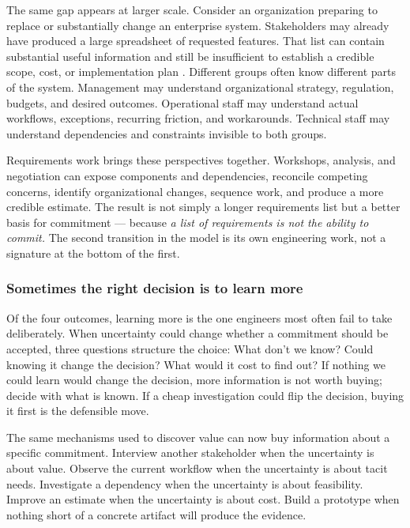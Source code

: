The same gap appears at larger scale. Consider an organization preparing to replace or substantially
change an enterprise system. Stakeholders may already have produced a large spreadsheet of requested
features. That list can contain substantial useful information and still be insufficient to
establish a credible scope, cost, or implementation plan \citep{kostova2019canvas}. Different groups often know
different parts of the system. Management may understand organizational strategy, regulation,
budgets, and desired outcomes. Operational staff may understand actual workflows, exceptions,
recurring friction, and workarounds. Technical staff may understand dependencies and constraints
invisible to both groups.

Requirements work brings these perspectives together. Workshops, analysis, and negotiation can
expose components and dependencies, reconcile competing concerns, identify organizational changes,
sequence work, and produce a more credible estimate. The result is not simply a longer requirements
list but a better basis for commitment --- because \emph{a list of requirements is not the ability to
commit.} The second transition in the model is its own engineering work, not a signature at the
bottom of the first.

\subsubsection{Sometimes the right decision is to learn more}\label{sec-learn-more}

Of the four outcomes, learning more is the one engineers most often fail to take deliberately. When
uncertainty could change whether a commitment should be accepted, three questions structure the
choice: What don't we know? Could knowing it change the decision? What would it cost to find out?
If nothing we could learn would change the decision, more information is not worth buying; decide
with what is known. If a cheap investigation could flip the decision, buying it first is the
defensible move.

The same mechanisms used to discover value can now buy information about a specific
commitment. Interview another stakeholder when the uncertainty is about value. Observe the
current workflow when the uncertainty is about tacit needs. Investigate a dependency when the
uncertainty is about feasibility. Improve an estimate when the uncertainty is about cost. Build a
prototype when nothing short of a concrete artifact will produce the evidence.

